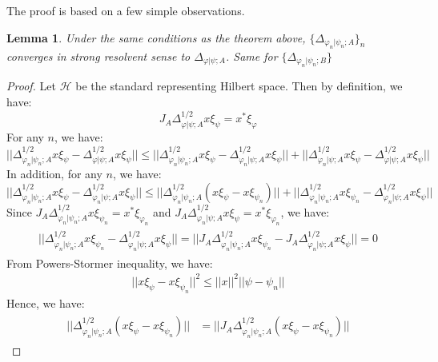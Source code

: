 \documentclass[a4paper,11pt]{article}
\newtheorem{lemma}[theorem]{Lemma}
\theoremstyle{definition}
\begin{document}
The proof is based on a few simple observations.
\begin{lemma}
    Under the same conditions as the theorem above, $\{\Delta_{\varphi_n|\psi_n;A}\}_n$ converges in strong resolvent sense to $\Delta_{\varphi|\psi;A}$. Same for $\{\Delta_{\varphi_n|\psi_n;B}\}$
\end{lemma}
\begin{proof}
    Let $\mathcal{H}$ be the standard representing Hilbert space. Then by definition, we have:
    \begin{equation}
        J_A\Delta^{1/2}_{\varphi|\psi;A}x\xi_{\psi} = x^*\xi_{\varphi}
    \end{equation}
    For any $n$, we have:
    \begin{equation}
        ||\Delta^{1/2}_{\varphi_n|\psi_n;A}x\xi_{\psi} - \Delta^{1/2}_{\varphi|\psi;A}x\xi_{\psi}|| \leq ||\Delta^{1/2}_{\varphi_n|\psi_n;A}x\xi_\psi - \Delta^{1/2}_{\varphi_n|\psi;A}x\xi_\psi|| + ||\Delta^{1/2}_{\varphi_n|\psi;A}x\xi_\psi - \Delta^{1/2}_{\varphi|\psi;A}x\xi_\psi|| 
    \end{equation}
    In addition, for any $n$, we have:
    \begin{equation}
        ||\Delta^{1/2}_{\varphi_n|\psi_n;A}x\xi_\psi - \Delta^{1/2}_{\varphi_n|\psi;A}x\xi_\psi|| \leq ||\Delta^{1/2}_{\varphi_n|\psi_n;A}(x\xi_\psi - x\xi_{\psi_n})|| + ||\Delta^{1/2}_{\varphi_n|\psi_n;A}x\xi_{\psi_n} - \Delta^{1/2}_{\varphi_n|\psi;A}x\xi_{\psi}||
    \end{equation}
    Since $J_A\Delta^{1/2}_{\varphi_n|\psi_n;A}x\xi_{\psi_n} = x^*\xi_{\varphi_n}$ and $J_A\Delta^{1/2}_{\varphi_n|\psi;A}x\xi_\psi = x^*\xi_{\varphi_n}$, we have:
    \begin{align}
        \begin{split}
            ||\Delta^{1/2}_{\varphi_n|\psi_n;A}x\xi_{\psi_n} - \Delta^{1/2}_{\varphi_n|\psi;A}x\xi_{\psi}|| = ||J_A\Delta^{1/2}_{\varphi_n|\psi_n;A}x\xi_{\psi_n} - J_A\Delta^{1/2}_{\varphi_n|\psi;A}x\xi_{\psi}|| = 0
        \end{split}
    \end{align}
    From Powers-Stormer inequality, we have:
    \begin{align}
        ||x\xi_\psi -x\xi_{\psi_n}||^2 \leq ||x||^2||\psi-\psi_n||
    \end{align}
    Hence, we have:
    \begin{align}
        \begin{split}
            ||\Delta^{1/2}_{\varphi_n|\psi_n;A}(x\xi_\psi -x\xi_{\psi_n})|| &= ||J_A\Delta^{1/2}_{\varphi_n|\psi_n;A}(x\xi_\psi - x\xi_{\psi_n})||

\end{split}
\end{align}
\end{proof}
\end{document}
